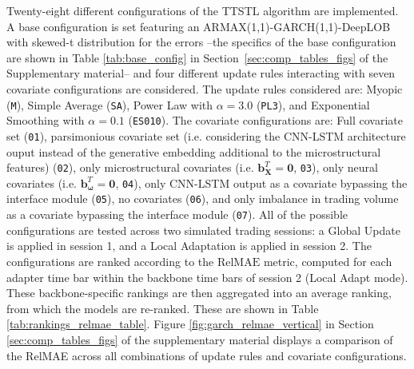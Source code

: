 \documentclass{rQUF2e}
\theoremstyle{plain}
\theoremstyle{definition}
\theoremstyle{remark}
\begin{document}
Twenty-eight different configurations of the TTSTL algorithm are implemented. A base configuration is set featuring an ARMAX(1,1)-GARCH(1,1)-DeepLOB with skewed-t distribution for the errors --the specifics of the base configuration are shown in Table \ref{tab:base_config} in Section~\ref{sec:comp_tables_figs} of the Supplementary material-- and four different update rules interacting with seven covariate configurations are considered. The update rules considered are: Myopic (\verb|M|), Simple Average (\verb|SA|), Power Law with $\alpha = 3.0$ (\verb|PL3|), and Exponential Smoothing with $\alpha = 0.1$ (\verb|ES010|). The covariate configurations are: Full covariate set (\verb|01|), parsimonious covariate set (i.e. considering the CNN-LSTM architecture ouput instead of the generative embedding additional to the microstructural features) (\verb|02|), only microstructural covariates (i.e. $\mathbf{b}^T_{\mathbf{X}} = \mathbf{0}$, \verb|03|), only neural covariates (i.e. $\mathbf{b}^T_{\boldsymbol{\omega}} = \mathbf{0}$, \verb|04|), only CNN-LSTM output as a covariate bypassing the interface module (\verb|05|), no covariates (\verb|06|), and only imbalance in trading volume as a covariate bypassing the interface module (\verb|07|). All of the possible configurations are tested across two simulated trading sessions: a Global Update is applied in session 1, and a Local Adaptation is applied in session 2. The configurations are ranked according to the $\mathrm{RelMAE}$ metric, computed for each adapter time bar within the backbone time bars of session 2 (Local Adapt mode). These backbone-specific rankings are then aggregated into an average ranking, from which the models are re-ranked. These are shown in Table \ref{tab:rankings_relmae_table}. Figure \ref{fig:garch_relmae_vertical} in Section \ref{sec:comp_tables_figs} of the supplementary material displays a comparison of the RelMAE across all combinations of update rules and covariate configurations.
\end{document}

